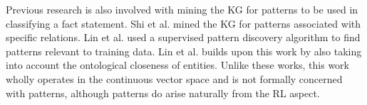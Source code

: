 Previous research is also involved with mining the KG for patterns to be used in classifying a fact statement.
Shi et al. \cite{Shi2016} mined the KG for patterns associated with specific relations. %
Lin et al. \cite{Lin2019} used a supervised pattern discovery algorithm to find patterns relevant to training data. Lin et al. \cite{Lin2018a} builds upon this work by also taking into account the ontological closeness of entities. %
 Unlike these works, this work wholly operates in the continuous vector space and is not formally concerned with patterns, although patterns do arise naturally from the RL aspect.

\par

